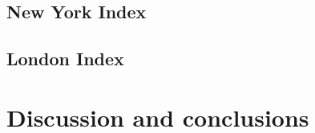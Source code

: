 \documentclass[preprint, 3p,
authoryear]{elsarticle} %
\begin{document}
\hypertarget{new-york-index}{%
\subsection{New York Index}\label{new-york-index}}

\hypertarget{london-index}{%
\subsection{London Index}\label{london-index}}

\hypertarget{discussion-and-conclusions}{%
\section{Discussion and conclusions}\label{discussion-and-conclusions}}

\renewcommand\refname{References}

\end{document}
